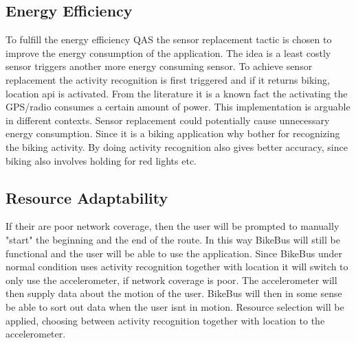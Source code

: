 \subsection{Energy Efficiency}
To fulfill the energy efficiency QAS the sensor replacement tactic is chosen to improve the energy consumption of the application. The idea is a least costly sensor triggers another more energy consuming sensor. To achieve sensor replacement the activity recognition is first triggered and if it returns biking, location api is activated. From the literature \cite{Kjaergaard2010} it is a known fact the activating the GPS/radio consumes a certain amount of power. This implementation is arguable in different contexts. Sensor replacement could potentially cause unnecessary energy consumption. Since it is a biking application why bother for recognizing the biking activity. By doing activity recognition also gives better accuracy, since biking also involves holding for red lights etc. 


\subsection{Resource Adaptability}
If their are poor network coverage, then the user will be prompted to manually "start" the beginning and the end of the route. In this way BikeBus will still be functional and the user will be able to use the application. Since BikeBus under normal condition uses activity recognition together with location it will switch to only use the accelerometer, if network coverage is poor. The accelerometer will then supply data about the motion of the user. BikeBus will then in some sense be able to sort out data when the user isnt in motion. Resource selection will be applied, choosing between activity recognition together with location to the accelerometer. 



 